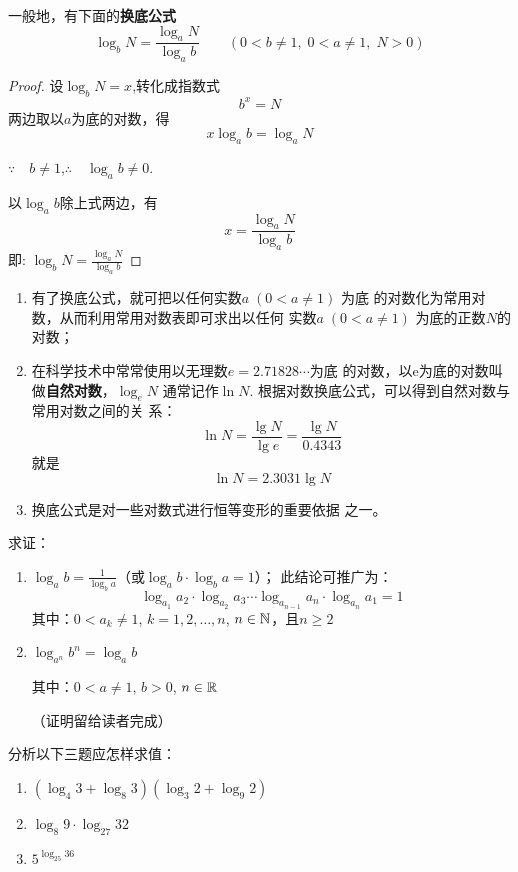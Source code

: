 一般地，有下面的\textbf{换底公式}
$$\log_{b}N=\frac{\log_{a}N}{\log_{a}b}\qquad (0<b\neq1,\; 0<a\neq1,\; N>0)$$

\begin{proof}
    设$\log_b N=x$,转化成指数式
$$b^{x}=N$$
两边取以$a$为底的对数，得
$$x\log_{a}b=\log_{a}N $$

$\because \quad b\neq1$,\qquad $\therefore \quad \log_a b\neq 0$.

以$\log_a b$除上式两边，有
\[x=\frac{\log_a N}{\log_a b}\]
即: $\log_b N=\frac{\log_a N}{\log_a b}$
\end{proof}

\begin{note}
\begin{enumerate}
    \item 有了换底公式，就可把以任何实数$a\; (0<a\ne 1)$
    为底
    的对数化为常用对数，从而利用常用对数表即可求出以任何
    实数$a\; (0<a\ne 1)$
    为底的正数$N$的对数；
    \item 在科学技术中常常使用以无理数$e=2.71828\cdots$为底
    的对数，以e为底的对数叫做\textbf{自然对数}，$\log_e N$
    通常记作$\ln N$. 
    根据对数换底公式，可以得到自然对数与常用对数之间的关
    系：
    \[\ln N=\frac{\lg N}{\lg e}=\frac{\lg N}{0.4343}\]
    就是
    \[\ln N=2.3031\lg N\]
\item 换底公式是对一些对数式进行恒等变形的重要依据
    之一。
\end{enumerate}
\end{note}

\begin{example}
求证：\begin{enumerate}[(1)]
    \item $\log_a b=\frac{1}{\log_b a}$\quad （或$\log_a b\cdot \log_b a=1$）；
此结论可推广为：
\[\log_{a_1}a_2\cdot \log_{a_2}a_3\cdots \log_{a_{n-1}}a_n\cdot \log_{a_n}a_1=1\]
其中：$0<a_k\ne 1$, $k=1,2,\ldots, n$, $n\in\mathbb{N}$，且$n\ge 2$

\item $\log_{a^n}b^n=\log_a b$

其中：$0<a\ne 1$, $b>0$, $n\in\mathbb{R}$

（证明留给读者完成）
\end{enumerate}
\end{example}

\begin{blk}
    分析以下三题应怎样求值：  
\begin{enumerate}[(1)]
    \item $(\log_{4}3+\log_{8}3)(\log_{3}2+\log_{9}2)$
    \item $\log_{8}9\cdot \log_{27}32$
    \item $5^{\log_{25}36}$
\end{enumerate}  
\end{blk}

